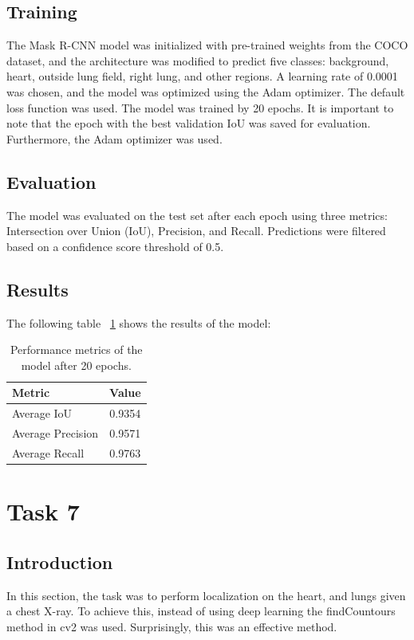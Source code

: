 \documentclass[10pt,twocolumn,letterpaper]{article}
\begin{document}
\subsection{Training}
The Mask R-CNN model was initialized with pre-trained weights from the COCO dataset, and the architecture was modified to predict five classes: background, heart, outside lung field, right lung, and other regions. A learning rate of 0.0001 was chosen, and the model was optimized using the Adam optimizer. The default loss function was used. The model was trained by 20 epochs. It is important to note that the epoch with the best validation IoU was saved for evaluation. Furthermore, the Adam optimizer was used.

\subsection{Evaluation}
The model was evaluated on the test set after each epoch using three metrics: Intersection over Union (IoU), Precision, and Recall. Predictions were filtered based on a confidence score threshold of 0.5.

\subsection{Results}
The following table ~\ref{tab:model_performance} shows the results of the model:

\begin{table}[h!]
    \centering
    \begin{tabular}{l|c|}
        \hline
        \bf{Metric} & \bf{Value} \\ \hline
        Average IoU & 0.9354 \\ \hline
        Average Precision & 0.9571 \\ \hline
        Average Recall & 0.9763 \\ \hline
    \end{tabular}
    \caption{Performance metrics of the model after 20 epochs.}
    \label{tab:model_performance}
\end{table}


\section{Task 7}

\subsection{Introduction}
In this section, the task was to perform localization on the heart, and lungs given a chest X-ray. To achieve this, instead of using deep learning the findCountours method in cv2 was used. Surprisingly, this was an effective method.
\end{document}
